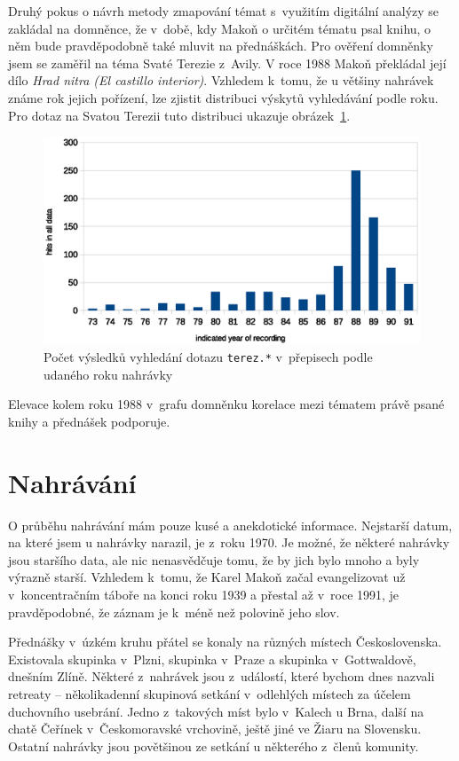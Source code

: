 Druhý pokus o návrh metody zmapování témat s~využitím digitální analýzy se zakládal na
domněnce, že v~době, kdy Makoň o určitém tématu psal knihu, o něm bude
pravděpodobně také mluvit na přednáškách. Pro ověření domněnky jsem se zaměřil
na téma Svaté Terezie z~Avily. V roce 1988 Makoň překládal její dílo {\em Hrad nitra
(El castillo interior)}. Vzhledem k~tomu, že u většiny nahrávek známe rok jejich
pořízení, lze zjistit distribuci výskytů vyhledávání podle roku. Pro dotaz na
Svatou Terezii tuto distribuci ukazuje obrázek~\ref{fig:teresa-year}.

\begin{figure}[htpb]
\includegraphics[scale=0.9]{rc/teresa-by-year.eps}
\caption{Počet výsledků vyhledání dotazu \texttt{terez.*} v~přepisech podle
udaného roku nahrávky}
\label{fig:teresa-year}
\end{figure}

Elevace kolem roku 1988 v~grafu domněnku korelace mezi tématem právě psané knihy
a přednášek podporuje.

\section{Nahrávání}

O průběhu nahrávání mám pouze kusé a anekdotické informace. Nejstarší datum, na
které jsem u nahrávky narazil, je z~roku 1970. Je možné, že některé nahrávky
jsou staršího data, ale nic nenasvědčuje tomu, že by jich bylo mnoho a byly
výrazně starší. Vzhledem k~tomu, že Karel Makoň začal evangelizovat už
v~koncentračním táboře na konci roku 1939 a přestal až v~roce 1991, je
pravděpodobné, že záznam je k~méně než polovině jeho slov.

Přednášky v~úzkém kruhu přátel se konaly na různých místech Československa.
Existovala skupinka v~Plzni, skupinka v~Praze a skupinka v~Gottwaldově, dnešním
Zlíně. Některé z~nahrávek jsou z~událostí, které bychom dnes nazvali retreaty --
několikadenní skupinová setkání v~odlehlých místech za účelem duchovního
usebrání. Jedno z~takových míst bylo v~Kalech u Brna, další na chatě Čeřínek
v~Českomoravské vrchovině, ještě jiné ve Žiaru na Slovensku. Ostatní nahrávky
jsou povětšinou ze setkání u některého z~členů komunity.

